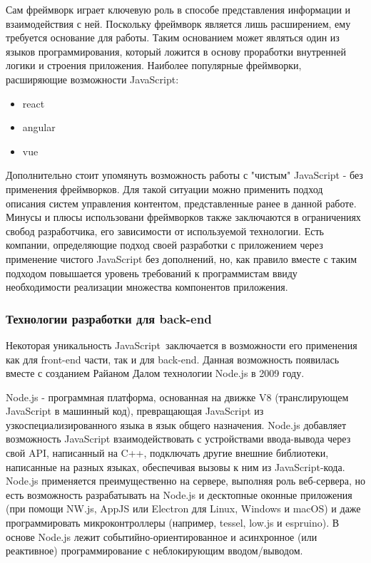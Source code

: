         Сам фреймворк играет ключевую роль в способе представления информации и взаимодействия с ней.
        Поскольку фреймворк является лишь расширением, ему требуется основание для работы.
        Таким основанием может являться один из языков программирования, который ложится в основу проработки внутренней логики и строения приложения.
        Наиболее популярные фреймворки, расширяющие возможности JavaScript:
        \begin{itemize}
            \item react
            \item angular
            \item vue
        \end{itemize}
        Дополнительно стоит упомянуть возможность работы с "чистым" JavaScript - без применения фреймворков.
        Для такой ситуации можно применить подход описания систем управления контентом, представленные ранее в данной работе.
        Минусы и плюсы использовани фреймворков также заключаются в ограничениях свобод разработчика, его зависимости от используемой технологии.
        Есть компании, определяющие подход своей разработки с приложением через применение чистого JavaScript без дополнений, но, как правило вместе с таким подходом повышается уровень требований к программистам ввиду необходимости реализации множества компонентов приложения.

    \subsubsection{Технологии разработки для back-end}
        Некоторая уникальность JavaScript заключается в возможности его применения как для front-end части, так и для back-end.
        Данная возможность появилась вместе с созданием Райаном Далом технологии Node.js в 2009 году.

        Node.js - программная платформа, основанная на движке V8 (транслирующем JavaScript в машинный код), превращающая JavaScript из узкоспециализированного языка в язык общего назначения.
        Node.js добавляет возможность JavaScript взаимодействовать с устройствами ввода-вывода через свой API, написанный на C++, подключать другие внешние библиотеки, написанные на разных языках, обеспечивая вызовы к ним из JavaScript-кода.
        Node.js применяется преимущественно на сервере, выполняя роль веб-сервера, но есть возможность разрабатывать на Node.js и десктопные оконные приложения (при помощи NW.js, AppJS или Electron для Linux, Windows и macOS) и даже программировать микроконтроллеры (например, tessel, low.js и espruino).
        В основе Node.js лежит событийно-ориентированное и асинхронное (или реактивное) программирование с неблокирующим вводом/выводом. %
        
